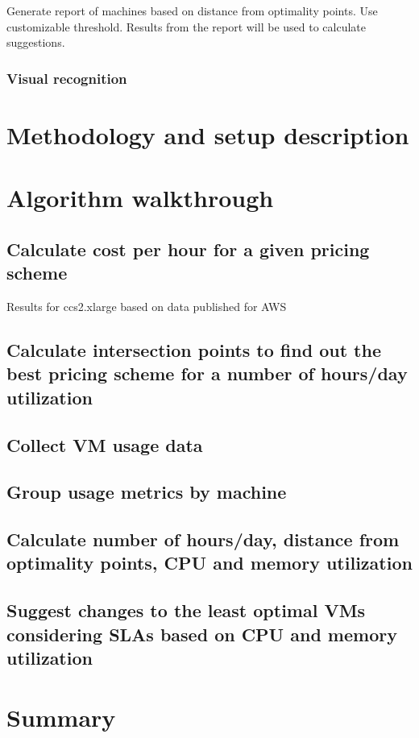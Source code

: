 \documentclass[]{final_report}
\begin{document}
Generate report of machines based on distance from optimality points. Use customizable threshold. 
Results from the report will be used to calculate suggestions.

\subsubsection{Visual recognition}



\section{Methodology and setup description}

\section{Algorithm walkthrough}
\subsection{Calculate cost per hour for a given pricing scheme}
Results for ccs2.xlarge based on data published for AWS~\cite{AWS:2014} \par
{}
\subsection{Calculate intersection points to find out the best pricing scheme for a number of hours/day utilization}
\subsection{Collect VM usage data}
\subsection{Group usage metrics by machine}
\subsection{Calculate number of hours/day, distance from optimality points, CPU and memory utilization}
\subsection{Suggest changes to the least optimal VMs considering SLAs based on CPU and memory utilization}

\section{Summary}
\end{document}
